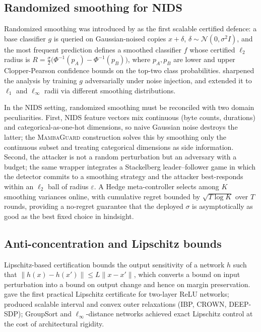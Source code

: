 \documentclass[journal,twoside]{IEEEtran}
\begin{document}
\subsection{Randomized smoothing for NIDS}
Randomized smoothing was introduced by \cite{cohen2019smoothing} as the
first scalable certified defence: a base classifier $g$ is queried on
Gaussian-noised copies $x+\delta$, $\delta\sim\mathcal{N}(0,\sigma^2 I)$,
and the most frequent prediction defines a smoothed classifier $f$ whose
certified $\ell_2$ radius is
$R = \tfrac{\sigma}{2}\bigl(\Phi^{-1}(p_A)-\Phi^{-1}(p_B)\bigr)$,
where $p_A,p_B$ are lower and upper Clopper-Pearson confidence bounds on
the top-two class probabilities. \cite{salman2019adv} sharpened the
analysis by training $g$ adversarially under noise injection, and
\cite{yang2020rsmooth} extended it to $\ell_1$ and $\ell_\infty$ radii
via different smoothing distributions.

In the NIDS setting, randomized smoothing must be reconciled with two
domain peculiarities. First, NIDS feature vectors mix continuous
(byte counts, durations) and categorical-as-one-hot dimensions, so
naive Gaussian noise destroys the latter; the \textsc{MambaGuard}
construction \cite{anaedevha2024surrogate} solves this by smoothing only
the continuous subset and treating categorical dimensions as side
information. Second, the attacker is not a random perturbation but an
adversary with a budget; the same wrapper integrates a Stackelberg
leader--follower game in which the detector commits to a smoothing
strategy and the attacker best-responds within an $\ell_2$ ball of
radius $\varepsilon$. A Hedge meta-controller \cite{cesa2006prediction}
selects among $K$ smoothing variances online, with cumulative regret
bounded by $\sqrt{T \log K}$ over $T$ rounds, providing a no-regret
guarantee that the deployed $\sigma$ is asymptotically as good as the
best fixed choice in hindsight.

\subsection{Anti-concentration and Lipschitz bounds}
Lipschitz-based certification bounds the output sensitivity of a network
$h$ such that $\|h(x)-h(x')\|\le L\|x-x'\|$, which converts a bound on
input perturbation into a bound on output change and hence on margin
preservation. \cite{hein2017formal} gave the first practical Lipschitz
certificate for two-layer ReLU networks;
\cite{gowal2019ibp,wong2018convex} produced scalable interval and convex
outer relaxations (IBP, CROWN, DEEP-SDP); GroupSort and
$\ell_\infty$-distance networks \cite{anil2019sorting} achieved exact
Lipschitz control at the cost of architectural rigidity.
\end{document}
